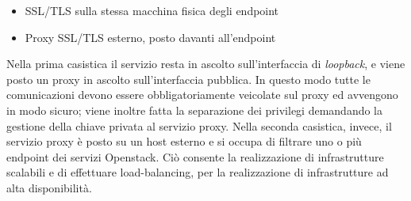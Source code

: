 \documentclass[../main.tex]{subfiles}
\begin{document}
\begin{itemize}
\item SSL/TLS sulla stessa macchina fisica degli endpoint
\begin{figure}[H]
\centering
{}
\caption*[Proxy SSL/TLS sulla stessa macchina fisica \cite{OpenStackSecurity}]{}\label{SSLPhys}
\end{figure}


\item Proxy SSL/TLS esterno, posto davanti all'endpoint
\begin{figure}[H]
\centering
{}
\caption*[Proxy SSL/TLS esterno \cite{OpenStackSecurity}]{}\label{SSLInFront}
\end{figure}
\end{itemize}

Nella prima casistica il servizio resta in ascolto sull'interfaccia di \textit{loopback}, e viene posto un proxy in ascolto sull'interfaccia pubblica. In questo modo tutte le comunicazioni devono essere obbligatoriamente veicolate sul proxy ed avvengono in modo sicuro; viene inoltre fatta la separazione dei privilegi demandando la gestione della chiave privata al servizio proxy.
Nella seconda casistica, invece, il servizio proxy è posto su un host esterno e si occupa di filtrare uno o più endpoint dei servizi Openstack. Ciò consente la realizzazione di infrastrutture scalabili e di effettuare load-balancing, per la realizzazione di infrastrutture ad alta disponibilità.
\end{document}

